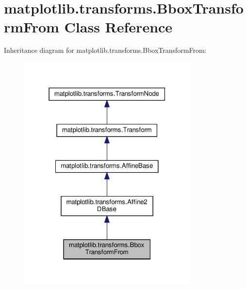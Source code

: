 \hypertarget{classmatplotlib_1_1transforms_1_1BboxTransformFrom}{}\section{matplotlib.\+transforms.\+Bbox\+Transform\+From Class Reference}
\label{classmatplotlib_1_1transforms_1_1BboxTransformFrom}


Inheritance diagram for matplotlib.\+transforms.\+Bbox\+Transform\+From\+:
\nopagebreak
\begin{figure}[H]
\begin{center}
\leavevmode
\includegraphics[width=259pt]{classmatplotlib_1_1transforms_1_1BboxTransformFrom__inherit__graph}
\end{center}
\end{figure}


